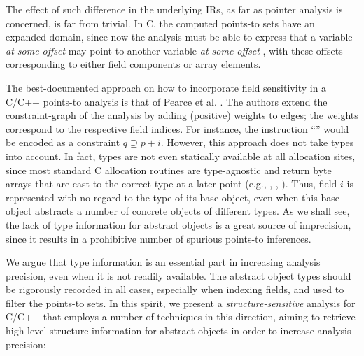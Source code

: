 The effect of such difference in the underlying IRs, as far as pointer
analysis is concerned, is far from trivial. In C, the computed
points-to sets have an expanded domain, since now the analysis must
be able to express that a variable  \emph{at some offset}
 may point-to another variable  \emph{at some offset}
, with these offsets corresponding to either field components or
array elements.

The best-documented approach on how to incorporate
field sensitivity in a C/C++ points-to analysis is that of Pearce et
al. \cite{paste/PearceKH04,toplas/PearceKH07}. The authors extend the
constraint-graph of the analysis by adding (positive) weights to 
edges; the weights correspond to the respective field indices. For
instance, the instruction ``'' would
be encoded as a constraint $q \supseteq p + i$. However, this approach
does not take types into account. In fact, types are not even
statically available at all allocation sites, since most standard C
allocation routines are type-agnostic and return byte arrays that are
cast to the correct type at a later point (e.g., ,
, ).  Thus, field $i$ is represented
with no regard to the type of its base object, even when this base
object abstracts a number of concrete objects of different types. As we
shall see, the
lack of type information for abstract objects is a great source of
imprecision, since it results in a prohibitive number of spurious
points-to inferences.

We argue that type information is an essential part in increasing
analysis precision, even when it is not readily available. The
abstract object types should be rigorously recorded in all cases,
especially when indexing fields, and used to filter the points-to
sets. In this spirit, we present a \emph{structure-sensitive} analysis
for C/C++ that employs a number of techniques in this direction,
aiming to retrieve high-level structure information for abstract
objects in order to increase analysis precision:

